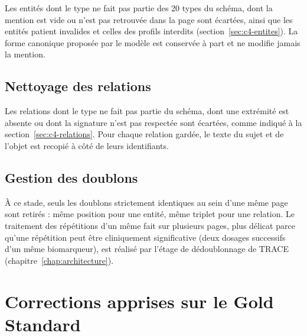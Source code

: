Les entités dont le type ne fait pas partie des 20 types du schéma, dont la mention est vide ou n'est pas retrouvée dans la page sont écartées, ainsi que les entités patient invalides et celles des profils interdits (section~\ref{sec:c4-entites}). La forme canonique proposée par le modèle est conservée à part et ne modifie jamais la mention.

\subsection{Nettoyage des relations}\label{sec:c4-nettoyage-relations}

Les relations dont le type ne fait pas partie du schéma, dont une extrémité est absente ou dont la signature n'est pas respectée sont écartées, comme indiqué à la section~\ref{sec:c4-relations}. Pour chaque relation gardée, le texte du sujet et de l'objet est recopié à côté de leurs identifiants.

\subsection{Gestion des doublons}\label{sec:c4-doublons}

À ce stade, seuls les doublons strictement identiques au sein d'une même page sont retirés : même position pour une entité, même triplet pour une relation. Le traitement des répétitions d'un même fait sur plusieurs pages, plus délicat parce qu'une répétition peut être cliniquement significative (deux dosages successifs d'un même biomarqueur), est réalisé par l'étage de dédoublonnage de TRACE (chapitre~\ref{chap:architecture}).

\section{Corrections apprises sur le Gold Standard}\label{sec:c4-appris}

